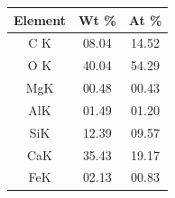 \begin{minipage}{\textwidth}
\begin{minipage}[b]{0.32\textwidth}
    \label{fig:00-08-select}
  \end{minipage}
  \hfill
  \begin{minipage}[b]{0.32\textwidth}
    \centering
    \begin{tabular}{|c|c|c|}
      \hline
      Element & Wt \% & At \% \\ \hline
      C K     & 08.04 & 14.52 \\ \hline
      O K     & 40.04 & 54.29 \\ \hline
      MgK     & 00.48 & 00.43 \\ \hline
      AlK     & 01.49 & 01.20 \\ \hline
      SiK     & 12.39 & 09.57 \\ \hline
      CaK     & 35.43 & 19.17 \\ \hline
      FeK     & 02.13 & 00.83 \\ \hline
    \end{tabular}
    \label{tab:00-08}
  \end{minipage}
\end{minipage}

